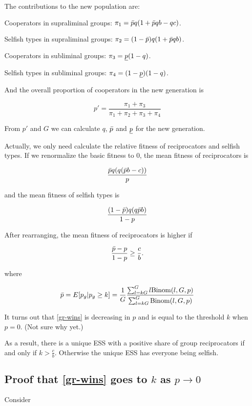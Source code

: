 \documentclass[12pt,a4paper]{article}
\begin{document}
The contributions to the new population are:

Cooperators in supraliminal groups: $\pi_1 = \bar{p} q(1 + \bar{p} qb - qc)$.

Selfish types in supraliminal groups: $\pi_2 = (1-\bar{p})q(1 + \bar{p} qb)$.

Cooperators in subliminal groups: $\pi_3 = \underline{p}(1-q)$.

Selfish types in subliminal groups: $\pi_4 = (1-\underline{p})(1-q)$.

And the overall proportion of cooperators in the new generation is

\begin{equation}
p' = \frac{\pi_1 + \pi_3}{\pi_1 + \pi_2 + \pi_3 + \pi_4}
\end{equation}

From $p'$ and $G$ we can calculate $q$, $\bar{p}$ and $\underline{p}$ for the new generation.

Actually, we only need calculate the relative fitness of reciprocators and selfish types. If we renormalize the basic fitness to 0, the mean fitness
of reciprocators is

\[
\frac{
  \bar{p} q(q(\bar{p} b - c))
}{
  p
}
\]

and the mean fitness of selfish types is

\[
\frac{
  (1 - \bar{p})q(q\bar{p} b)
}{
  1 - p
}
\]

After rearranging, the mean fitness of reciprocators is higher if


\begin{equation}
\label{gr-wins}
\frac{ \bar{p} - p}{ 1 - p} \ge \frac{c}{b}.
\end{equation}

where 

\[
\bar{p} = E[p_g | p_g \ge k] = \frac{1}{G} \frac{\sum_{l=kG}^G l \mathrm{Binom}(l,G,p)}{\sum_{l=kG}^G \mathrm{Binom}(l,G,p)}
\]

It turns out that \eqref{gr-wins} is decreasing in $p$ and is equal
to the threshold $k$ when $p = 0$. (Not sure why yet.)

As a result, there is a unique ESS with a positive share of group
reciprocators
if and only if $k > \frac{c}{b}$. Otherwise the unique ESS has everyone being selfish.


\subsection*{Proof that \eqref{gr-wins} goes to $k$ as $p \to 0$}


Consider
\end{document}
